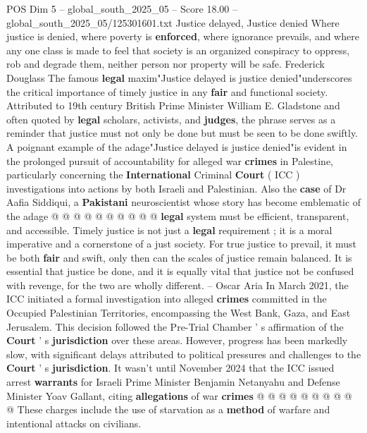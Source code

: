 \begin{textsample}{POS Dim 5 – global\_south\_2025\_05 – Score 18.00 – global\_south\_2025\_05/125301601.txt}  \label{ex:f5_pos_193}
Justice delayed, Justice denied Where justice is denied, where poverty is \textbf{enforced}, where ignorance prevails, and where any one class is made to feel that society is an organized conspiracy to oppress, rob and degrade them, neither person nor property will be safe.
Frederick Douglass The famous \textbf{legal} maxim"Justice delayed is justice denied"underscores the critical importance of timely justice in any \textbf{fair} and functional society.
Attributed to 19th century British Prime Minister William E.
Gladstone and often quoted by \textbf{legal} scholars, activists, and \textbf{judges}, the phrase serves as a reminder that justice must not only be done but must be seen to be done swiftly.
A poignant example of the adage"Justice delayed is justice denied"is evident in the prolonged pursuit of accountability for alleged war \textbf{crimes} in Palestine, particularly concerning the \textbf{International} Criminal \textbf{Court} ( ICC ) investigations into actions by both Israeli and Palestinian.
Also the \textbf{case} of Dr Aafia Siddiqui, a \textbf{Pakistani} neuroscientist whose story has become emblematic of the adage @ @ @ @ @ @ @ @ @ @ \textbf{legal} system must be efficient, transparent, and accessible.
Timely justice is not just a \textbf{legal} requirement ; it is a moral imperative and a cornerstone of a just society.
For true justice to prevail, it must be both \textbf{fair} and swift, only then can the scales of justice remain balanced.
It is essential that justice be done, and it is equally vital that justice not be confused with revenge, for the two are wholly different. -- Oscar Aria In March 2021, the ICC initiated a formal investigation into alleged \textbf{crimes} committed in the Occupied Palestinian Territories, encompassing the West Bank, Gaza, and East Jerusalem.
This decision followed the Pre-Trial Chamber ' s affirmation of the \textbf{Court} ' s \textbf{jurisdiction} over these areas.
However, progress has been markedly slow, with significant delays attributed to political pressures and challenges to the \textbf{Court} ' s \textbf{jurisdiction}.
It wasn't until November 2024 that the ICC issued arrest \textbf{warrants} for Israeli Prime Minister Benjamin Netanyahu and Defense Minister Yoav Gallant, citing \textbf{allegations} of war \textbf{crimes} @ @ @ @ @ @ @ @ @ @ These charges include the use of starvation as a \textbf{method} of warfare and intentional attacks on civilians.

\end{textsample}
